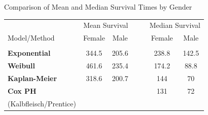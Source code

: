 \documentclass[envcountsect, 10pt, portrait, palatino]{beamer}
\begin{document}
\begin{frame}{Comparison of Mean and Median Survival Times by Gender}

\small
\begin{center}
\begin{tabular}{lccccc}
\hline
             & \multicolumn{2}{c}{Mean Survival} & ~~&
             \multicolumn{2}{c}{Median Survival}\\ \cline{2-3} \cline{5-6}
Model/Method & Female & Male & & Female & Male\\ \hline \\
{\bf Exponential}
& 344.5 & 205.6 & & 238.8 & 142.5 \\[1ex]
{\bf Weibull}
& 461.6 & 235.4 & & 174.2 & 88.8 \\[1ex]
{\bf Kaplan-Meier}
& 318.6 & 200.7 & & 144 & 70 \\[1ex]
{\bf Cox PH}
&       &       & & 131 & 72 \\
(Kalbfleisch/Prentice)
\\ \hline
\end{tabular}
\end{center}
\end{frame} 
\end{document}
